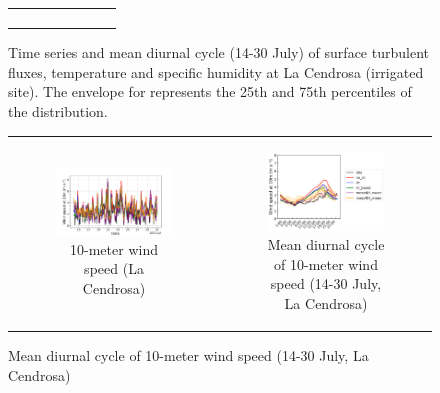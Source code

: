 \begin{figure}[t]
\begin{tabular}{cc}
\begin{subfigure}[t]{0.5\textwidth}
        \end{subfigure}
    \end{tabular}
    \caption{Time series and mean diurnal cycle (14-30 July) of surface turbulent fluxes, temperature and specific humidity at La Cendrosa (irrigated site). The envelope for \mesomean represents the 25th and 75th percentiles of the distribution.}
    \label{fig:cendrosa_surfacevars}
\end{figure}


\begin{figure}[t]
    \centering
    \begin{tabular}{cc}
        \begin{subfigure}[t]{0.5\textwidth}
            \caption{10-meter wind speed (La Cendrosa)}
            \includegraphics[width=\textwidth]{images/chap5/SOP_TS_DC/time_series_cendrosa_wind_speed_10m.png}
        \end{subfigure} &
        \begin{subfigure}[t]{0.5\textwidth}
            \caption{Mean diurnal cycle of 10-meter wind speed (14-30 July, La Cendrosa)}
            \includegraphics[width=\textwidth]{images/chap5/SOP_TS_DC/diurnal_cycle_cendrosa_wind_speed_10m.png}

\end{subfigure}
\end{tabular}
\end{figure}
